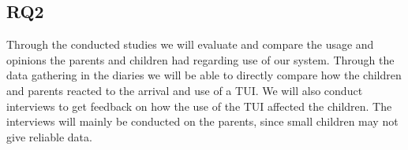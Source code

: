 \subsection{RQ2}
\label{sec: RQ3-methodology}

Through the conducted studies we will evaluate and compare the usage and opinions the parents and children had regarding use of our system. Through the data gathering in the diaries we will be able to directly compare how the children and parents reacted to the arrival and use of a TUI. We will also conduct interviews to get feedback on how the use of the TUI affected the children. The interviews will mainly be conducted on the parents, since small children may not give reliable data.